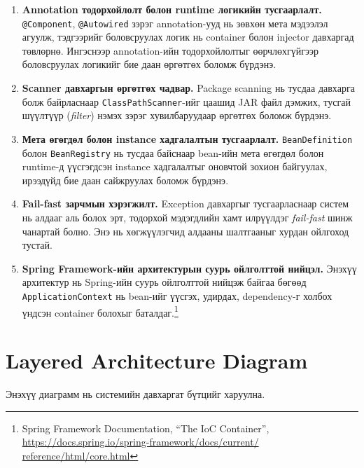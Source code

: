 \begin{enumerate}
    \item \textbf{Annotation тодорхойлолт болон runtime логикийн
    тусгаарлалт.}
    \texttt{@Component}, \texttt{@Autowired} зэрэг annotation-ууд
    нь зөвхөн мета мэдээлэл агуулж, тэдгээрийг боловсруулах логик
    нь container болон injector давхаргад төвлөрнө.
    Ингэснээр annotation-ийн тодорхойлолтыг өөрчлөхгүйгээр
    боловсруулах логикийг бие даан өргөтгөх боломж бүрдэнэ.

    \item \textbf{Scanner давхаргын өргөтгөх чадвар.}
    Package scanning нь тусдаа давхарга болж байрласнаар
    \texttt{ClassPathScanner}-ийг цаашид JAR файл дэмжих,
    тусгай шүүлтүүр (\textit{filter}) нэмэх зэрэг
    хувилбаруудаар өргөтгөх боломж бүрдэнэ.

    \item \textbf{Мета өгөгдөл болон instance хадгалалтын
    тусгаарлалт.}
    \texttt{BeanDefinition} болон \texttt{BeanRegistry} нь
    тусдаа байснаар bean-ийн мета өгөгдөл болон
    runtime-д үүсгэгдсэн instance хадгалалтыг
    оновчтой зохион байгуулах, ирээдүйд бие даан
    сайжруулах боломж бүрдэнэ.

    \item \textbf{Fail-fast зарчмын хэрэгжилт.}
    Exception давхаргыг тусгаарласнаар систем нь алдааг
    аль болох эрт, тодорхой мэдэгдлийн хамт илрүүлдэг
    \textit{fail-fast} шинж чанартай болно.
    Энэ нь хөгжүүлэгчид алдааны шалтгааныг хурдан
    ойлгоход тустай.

    \item \textbf{Spring Framework-ийн архитектурын суурь
    ойлголттой нийцэл.}
    Энэхүү архитектур нь Spring-ийн суурь ойлголттой
    нийцэж байгаа бөгөөд \texttt{ApplicationContext} нь
    bean-ийг үүсгэх, удирдах, dependency-г холбох
    үндсэн container болохыг баталдаг.\footnote{Spring
    Framework Documentation, ``The IoC Container'',
    \url{https://docs.spring.io/spring-framework/docs/current/
    reference/html/core.html}}
\end{enumerate}

\newpage
\section{Layered Architecture Diagram}

Энэхүү диаграмм нь системийн давхаргат бүтцийг харуулна.

